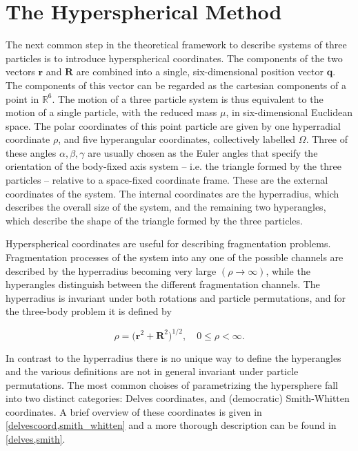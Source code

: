 \section{The Hyperspherical Method}\label{sec:hyperspherical}
The next common step in the theoretical framework to describe systems of three particles is to introduce hyperspherical coordinates. The components of the two vectors $\mathbf{r}$ and $\mathbf{R}$ are combined into a single, six-dimensional position vector $\mathbf{q}$. The components of this vector can be regarded as the cartesian components of a point in $\mathbb{R}^{6}$. The motion of a three particle system is thus equivalent to the motion of a single particle, with the reduced mass $\mu$, in six-dimensional Euclidean space. The polar coordinates of this point particle are given by one hyperradial coordinate $\rho$, and five hyperangular coordinates, collectively labelled $\Omega$. Three of these angles $\alpha, \beta, \gamma$ are usually chosen as the Euler angles that specify the  orientation of the body-fixed axis system -- i.e. the triangle formed by the three particles -- relative to a space-fixed coordinate frame. These are the external coordinates of the system. The internal coordinates are the hyperradius, which describes the overall size of the system, and the remaining two hyperangles, which describe the shape of the triangle formed by the  three particles. 

Hyperspherical coordinates are useful for describing fragmentation problems. Fragmentation processes of the system into any one of the possible channels are described by the hyperradius becoming very large $(\rho \rightarrow \infty)$, while the hyperangles distinguish between the different fragmentation channels. The hyperradius is invariant under both rotations and particle permutations, and for the three-body problem it is defined by

\begin{equation}
\rho = \Big(\mathbf{r}^{2} + \mathbf{R}^{2}\Big)^{1/2}, \quad 0\leq \rho < \infty.
\end{equation} 

In contrast to the hyperradius there is no unique way to define the hyperangles and the various definitions are not in general invariant under particle permutations. The most common choises of parametrizing the hypersphere fall into two distinct categories: Delves coordinates, and (democratic) Smith-Whitten coordinates. A brief overview of these coordinates is given in \cref{delvescoord,smith_whitten} and a more thorough description can be found in \cref{delves,smith}.

